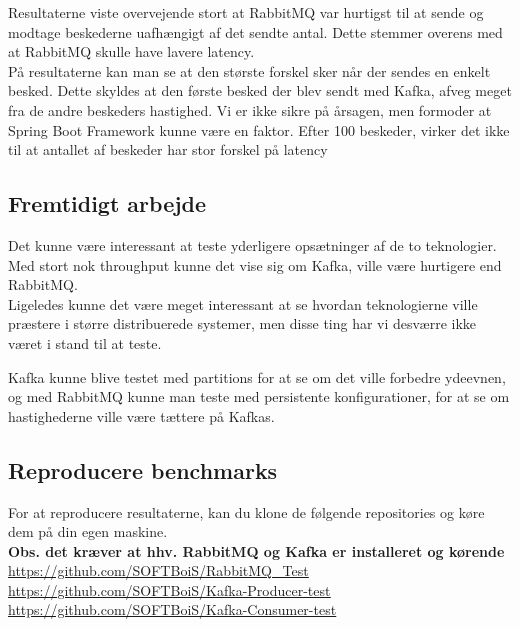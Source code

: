 \documentclass[
]{article}
\begin{document}
Resultaterne viste overvejende stort at RabbitMQ var hurtigst til at
sende og modtage beskederne uafhængigt af det sendte antal. Dette
stemmer overens med at RabbitMQ skulle have lavere latency.\cite{kafka-rabbit-comparison}\\
På resultaterne kan man se at den største forskel sker når der sendes en
enkelt besked. Dette skyldes at den første besked der blev sendt med
Kafka, afveg meget fra de andre beskeders hastighed. Vi er ikke sikre på
årsagen, men formoder at Spring Boot Framework kunne være en faktor.
Efter 100 beskeder, virker det ikke til at antallet af beskeder har stor
forskel på latency

\hypertarget{fremtidigt-arbejde}{%
\subsection{Fremtidigt arbejde}\label{fremtidigt-arbejde}}

Det kunne være interessant at teste yderligere opsætninger af de to
teknologier.\\
Med stort nok throughput kunne det vise sig om Kafka, ville være
hurtigere end RabbitMQ.\\
Ligeledes kunne det være meget interessant at se hvordan teknologierne
ville præstere i større distribuerede systemer, men disse ting har vi
desværre ikke været i stand til at teste.

Kafka kunne blive testet med partitions for at se om det ville forbedre
ydeevnen, og med RabbitMQ kunne man teste med persistente
konfigurationer, for at se om hastighederne ville være tættere på
Kafkas.
\pagebreak
\hypertarget{reproducere-benchmarks}{%
\subsection{Reproducere benchmarks}\label{reproducere-benchmarks}}

For at reproducere resultaterne, kan du klone de følgende repositories
og køre dem på din egen maskine.\\
\textbf{Obs. det kræver at hhv. RabbitMQ og Kafka er installeret og
kørende}\\
\href{https://github.com/SOFTBoiS/RabbitMQ_Test}{\underline{https://github.com/SOFTBoiS/RabbitMQ\_Test}}\\
\href{https://github.com/SOFTBoiS/Kafka-Producer-test}{\underline{https://github.com/SOFTBoiS/Kafka-Producer-test}}\\
\href{https://github.com/SOFTBoiS/Kafka-Consumer-test}{\underline{https://github.com/SOFTBoiS/Kafka-Consumer-test}}
\end{document}
